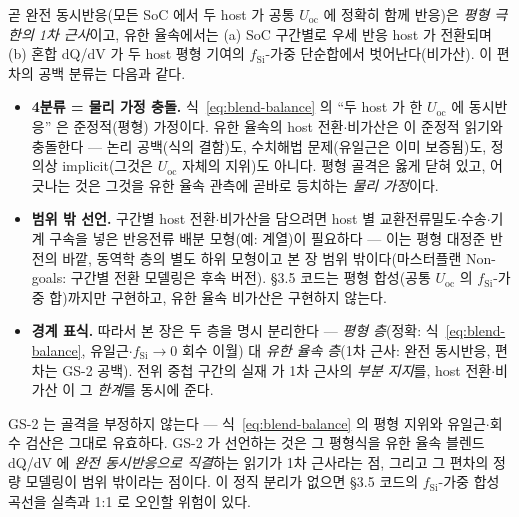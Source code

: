 곧 완전 동시반응(모든 SoC 에서 두 host 가 공통 $U_\mathrm{oc}$ 에 정확히 함께 반응)은 \emph{평형 극한의
1차 근사}이고, 유한 율속에서는 (a) SoC 구간별로 우세 반응 host 가 전환되며 (b) 혼합 dQ/dV 가 두 host
평형 기여의 $f_\mathrm{Si}$-가중 단순합에서 벗어난다(비가산). 이 편차의 공백 분류는 다음과 같다.
\begin{itemize}[leftmargin=1.4em,itemsep=1pt]
\item \textbf{4분류 = 물리 가정 충돌.} 식~\eqref{eq:blend-balance} 의 ``두 host 가 한 $U_\mathrm{oc}$
에 동시반응'' 은 준정적(평형) 가정이다. 유한 율속의 host 전환$\cdot$비가산은 이 준정적 읽기와 충돌한다
--- 논리 공백(식의 결함)도, 수치해법 문제(유일근은 이미 보증됨)도, 정의상 implicit(그것은
$U_\mathrm{oc}$ 자체의 지위)도 아니다. 평형 골격은 옳게 닫혀 있고, 어긋나는 것은 그것을 유한 율속
관측에 곧바로 등치하는 \emph{물리 가정}이다.
\item \textbf{범위 밖 선언.} 구간별 host 전환$\cdot$비가산을 담으려면 host 별 교환전류밀도$\cdot$수송$\cdot$기계
구속을 넣은 반응전류 배분 모형(예: \cite{ai_blend2022} 계열)이 필요하다 --- 이는 평형 대정준 반전의
바깥, 동역학 층의 별도 하위 모형이고 본 장 범위 밖이다(마스터플랜 Non-goals: 구간별 전환 모델링은 후속
버전). §3.5 코드는 평형 합성(공통 $U_\mathrm{oc}$ 의 $f_\mathrm{Si}$-가중 합)까지만 구현하고, 유한 율속
비가산은 구현하지 않는다.
\item \textbf{경계 표식.} 따라서 본 장은 두 층을 명시 분리한다 --- \emph{평형 층}(정확: 식~\eqref{eq:blend-balance},
유일근$\cdot$$f_\mathrm{Si}\to0$ 회수 이월) 대 \emph{유한 율속 층}(1차 근사: 완전 동시반응, 편차는 GS-2
공백). 전위 중첩 구간의 실재\cite{zhan_blend2026} 가 1차 근사의 \emph{부분 지지}를, host 전환$\cdot$비가산
\cite{ai_blend2022,chatzogiannakis_blend2025} 이 그 \emph{한계}를 동시에 준다.
\end{itemize}

\begin{warnbox}
GS-2 는 골격을 부정하지 않는다 --- 식~\eqref{eq:blend-balance} 의 평형 지위와 유일근$\cdot$회수 검산은
그대로 유효하다. GS-2 가 선언하는 것은 그 평형식을 유한 율속 블렌드 dQ/dV 에 \emph{완전 동시반응으로
직결}하는 읽기가 1차 근사라는 점, 그리고 그 편차의 정량 모델링이 범위 밖이라는 점이다. 이 정직 분리가
없으면 §3.5 코드의 $f_\mathrm{Si}$-가중 합성 곡선을 실측과 1:1 로 오인할 위험이 있다.
\end{warnbox}

